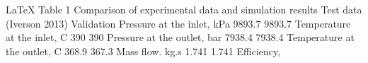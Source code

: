 
LaTeX
Table 1 Comparison of experimental data and simulation results
Test data (Iverson 2013)	Validation
Pressure at the inlet, kPa	9893.7	9893.7
Temperature at the inlet, C	390	390
Pressure at the outlet, bar	7938.4	7938.4
Temperature at the outlet, C	368.9	367.3
Mass flow. kg.s	1.741	1.741
Efficiency, %
